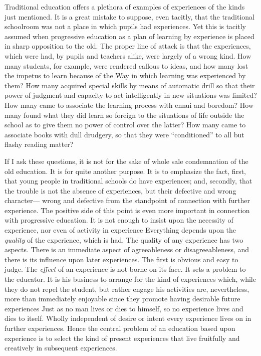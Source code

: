 Traditional education offers a plethora of examples of experiences of the kinds just 
mentioned. It is a great mistake to suppose, even tacitly, that the traditional schoolroom 
was not a place in which pupils had experiences. Yet this is tacitly assumed when 
progressive education as a plan of learning by experience is placed in sharp opposition to 
the old. The proper line of attack is that the experiences, which were had, by pupils and 
teachers alike, were largely of a wrong kind. How many students, for example, were 
rendered callous to ideas, and how many lost the impetus to learn because of the Way in 
which learning was experienced by them? How many acquired special skills by means of 
automatic drill so that their power of judgment and capacity to act intelligently in new 
situations was limited? How many came to associate the learning process with ennui and 
boredom? How many found what they did learn so foreign to the situations of life outside 
the school as to give them no power of control over the latter? How many came to 
associate books with dull drudgery, so that they were \enquote{conditioned} to all but flashy 
reading matter? 

If I ask these questions, it is not for the sake of whole sale condemnation of the old 
education. It is for quite another purpose. It is to emphasize the fact, first, that young 
people in traditional schools do have experiences; and, secondly, that the trouble is not 
the absence of experiences, but their defective and wrong character— wrong and defective 
from the standpoint of connection with further experience. The positive side of this point 
is even more important in connection with progressive education. It is not enough to 
insist upon the necessity of experience, nor even of activity in experience Everything 
depends upon the \textit{quality} of the experience, which is had. The quality of any experience 
has two aspects. There is an immediate aspect of agreeableness or disagreeableness, and 
there is its influence upon later experiences. The first is obvious and easy to judge. The 
\textit{effect} of an experience is not borne on its face. It sets a problem to the educator. It is his 
business to arrange for the kind of experiences which, while they do not repel the student, 
but rather engage his activities are, nevertheless, more than immediately enjoyable since 
they promote having desirable future experiences Just as no man lives or dies to himself, 
so no experience lives and dies to itself. Wholly independent of desire or intent every 
experience lives on in further experiences. Hence the central problem of an education 
based upon experience is to select the kind of present experiences that live fruitfully and 
creatively in subsequent experiences. 

